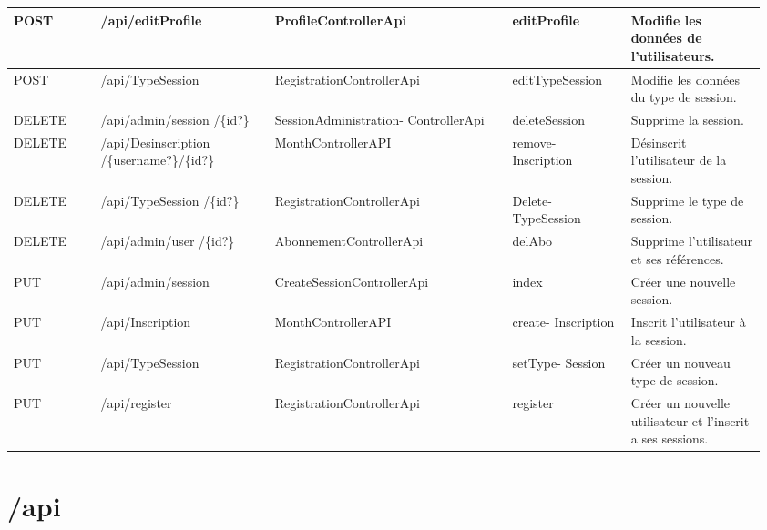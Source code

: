 		\newpage
			\begin{center}
				\begin{tabularx}{1.11\textwidth}{| T{0.11\linewidth} | S{0.22\linewidth} | S{0.3\linewidth} | S{0.151\linewidth} | S{0.175\linewidth} |}
					\hline
						POST & /api/editProfile & ProfileControllerApi & editProfile & Modifie les données de l'utilisateurs. \\
					\hline
						POST & /api/TypeSession & RegistrationControllerApi & editTypeSession & Modifie les données du type de session. \\
					\hline
					
					\hline
					
					\hline
						DELETE & /api/admin/session /\{id?\} & SessionAdministration- ControllerApi & deleteSession & Supprime la session. \\
					\hline
						DELETE & /api/Desinscription /\{username?\}/\{id?\} & MonthControllerAPI & remove- Inscription & Désinscrit l'utilisateur de la session. \\
					\hline
						DELETE & /api/TypeSession /\{id?\} & RegistrationControllerApi & Delete- TypeSession & Supprime le type de session. \\
					\hline
						DELETE & /api/admin/user /\{id?\} & AbonnementControllerApi & delAbo & Supprime l'utilisateur et ses références. \\
					\hline
			
					\hline
			
					\hline
						PUT & /api/admin/session & CreateSessionControllerApi & index & Créer une nouvelle session. \\
					\hline
						PUT & /api/Inscription & MonthControllerAPI & create- Inscription & Inscrit l'utilisateur à la session. \\
					\hline
						PUT & /api/TypeSession & RegistrationControllerApi & setType- Session & Créer un nouveau type de session. \\
					\hline
						PUT & /api/register & RegistrationControllerApi & register & Créer un nouvelle utilisateur et l'inscrit a ses sessions. \\
					\hline
				\end{tabularx}
			\end{center}


\newpage
\section{/api}
	

